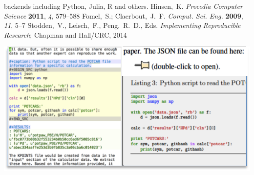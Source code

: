 \documentclass[journal=accacs,manuscript=article,email=true]{achemso}
\begin{document}
\begin{mcitethebibliography}{35}
  backends including Python, Julia, R and others.\relax
\mciteBstWouldAddEndPunctfalse
\mciteSetBstMidEndSepPunct{\mcitedefaultmidpunct}
{}{\mcitedefaultseppunct}\relax
\EndOfBibitem
{}
Hinsen,~K. \emph{Procedia Computer Science} \textbf{2011}, \emph{4},
  579--588\relax
\mciteBstWouldAddEndPuncttrue
\mciteSetBstMidEndSepPunct{\mcitedefaultmidpunct}
{\mcitedefaultendpunct}{\mcitedefaultseppunct}\relax
\EndOfBibitem
{}
Fomel,~S.; Claerbout,~J.~F. \emph{Comput. Sci. Eng.} \textbf{2009}, \emph{11},
  5--7\relax
\mciteBstWouldAddEndPuncttrue
\mciteSetBstMidEndSepPunct{\mcitedefaultmidpunct}
{\mcitedefaultendpunct}{\mcitedefaultseppunct}\relax
\EndOfBibitem
{}
Stodden,~V., Leisch,~F., Peng,~R.~D., Eds. \emph{Implementing Reproducible
  Research}; Chapman and Hall/CRC, 2014\relax
\mciteBstWouldAddEndPuncttrue
\mciteSetBstMidEndSepPunct{\mcitedefaultmidpunct}
{\mcitedefaultendpunct}{\mcitedefaultseppunct}\relax
\EndOfBibitem
\end{mcitethebibliography}


\newpage
\includegraphics{TOC}
\end{document}
